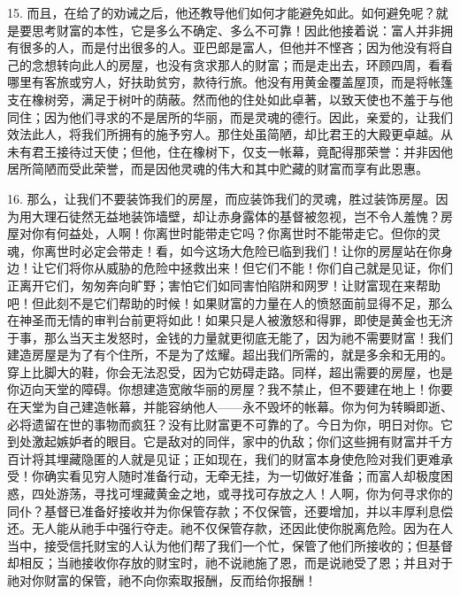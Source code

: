 15. 而且，在给了的劝诫之后，他还教导他们如何才能避免如此。如何避免呢？就是要思考财富的本性，它是多么不确定、多么不可靠！因此他接着说：富人并非拥有很多的人，而是付出很多的人。亚巴郎是富人，但他并不悭吝；因为他没有将自己的念想转向此人的房屋，也没有贪求那人的财富；而是走出去，环顾四周，看看哪里有客旅或穷人，好扶助贫穷，款待行旅。他没有用黄金覆盖屋顶，而是将帐篷支在橡树旁，满足于树叶的荫蔽。然而他的住处如此卓著，以致天使也不羞于与他同住；因为他们寻求的不是居所的华丽，而是灵魂的德行。因此，亲爱的，让我们效法此人，将我们所拥有的施予穷人。那住处虽简陋，却比君王的大殿更卓越。从未有君王接待过天使；但他，住在橡树下，仅支一帐幕，竟配得那荣誉：并非因他居所简陋而受此荣誉，而是因他灵魂的伟大和其中贮藏的财富而享有此恩惠。\par

16. 那么，让我们不要装饰我们的房屋，而应装饰我们的灵魂，胜过装饰房屋。因为用大理石徒然无益地装饰墙壁，却让赤身露体的基督被忽视，岂不令人羞愧？房屋对你有何益处，人啊！你离世时能带走它吗？你离世时不能带走它。但你的灵魂，你离世时必定会带走！看，如今这场大危险已临到我们！让你的房屋站在你身边！让它们将你从威胁的危险中拯救出来！但它们不能！你们自己就是见证，你们正离开它们，匆匆奔向旷野；害怕它们如同害怕陷阱和网罗！让财富现在来帮助吧！但此刻不是它们帮助的时候！如果财富的力量在人的愤怒面前显得不足，那么在神圣而无情的审判台前更将如此！如果只是人被激怒和得罪，即使是黄金也无济于事，那么当天主发怒时，金钱的力量就更彻底无能了，因为祂不需要财富！我们建造房屋是为了有个住所，不是为了炫耀。超出我们所需的，就是多余和无用的。穿上比脚大的鞋，你会无法忍受，因为它妨碍走路。同样，超出需要的房屋，也是你迈向天堂的障碍。你想建造宽敞华丽的房屋？我不禁止，但不要建在地上！你要在天堂为自己建造帐幕，并能容纳他人——永不毁坏的帐幕。你为何为转瞬即逝、必将遗留在世的事物而疯狂？没有比财富更不可靠的了。今日为你，明日对你。它到处激起嫉妒者的眼目。它是敌对的同伴，家中的仇敌；你们这些拥有财富并千方百计将其埋藏隐匿的人就是见证；正如现在，我们的财富本身使危险对我们更难承受！你确实看见穷人随时准备行动，无牵无挂，为一切做好准备；而富人却极度困惑，四处游荡，寻找可埋藏黄金之地，或寻找可存放之人！人啊，你为何寻求你的同仆？基督已准备好接收并为你保管存款；不仅保管，还要增加，并以丰厚利息偿还。无人能从祂手中强行夺走。祂不仅保管存款，还因此使你脱离危险。因为在人当中，接受信托财宝的人认为他们帮了我们一个忙，保管了他们所接收的；但基督却相反；当祂接收你存放的财宝时，祂不说祂施了恩，而是说祂受了恩；并且对于祂对你财富的保管，祂不向你索取报酬，反而给你报酬！\par

